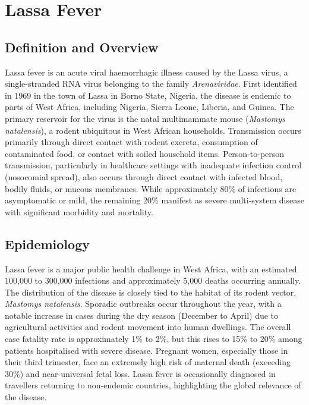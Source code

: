 \chapter{Lassa Fever}

\section*{Definition and Overview}
Lassa fever is an acute viral haemorrhagic illness caused by the Lassa virus, a single-stranded RNA virus belonging to the family \textit{Arenaviridae}. First identified in 1969 in the town of Lassa in Borno State, Nigeria, the disease is endemic to parts of West Africa, including Nigeria, Sierra Leone, Liberia, and Guinea. The primary reservoir for the virus is the natal multimammate mouse (\textit{Mastomys natalensis}), a rodent ubiquitous in West African households. Transmission occurs primarily through direct contact with rodent excreta, consumption of contaminated food, or contact with soiled household items. Person-to-person transmission, particularly in healthcare settings with inadequate infection control (nosocomial spread), also occurs through direct contact with infected blood, bodily fluids, or mucous membranes. While approximately 80\% of infections are asymptomatic or mild, the remaining 20\% manifest as severe multi-system disease with significant morbidity and mortality.

\section*{Epidemiology}
Lassa fever is a major public health challenge in West Africa, with an estimated 100,000 to 300,000 infections and approximately 5,000 deaths occurring annually. The distribution of the disease is closely tied to the habitat of its rodent vector, \textit{Mastomys natalensis}. Sporadic outbreaks occur throughout the year, with a notable increase in cases during the dry season (December to April) due to agricultural activities and rodent movement into human dwellings. The overall case fatality rate is approximately 1\% to 2\%, but this rises to 15\% to 20\% among patients hospitalised with severe disease. Pregnant women, especially those in their third trimester, face an extremely high risk of maternal death (exceeding 30\%) and near-universal fetal loss. Lassa fever is occasionally diagnosed in travellers returning to non-endemic countries, highlighting the global relevance of the disease.

